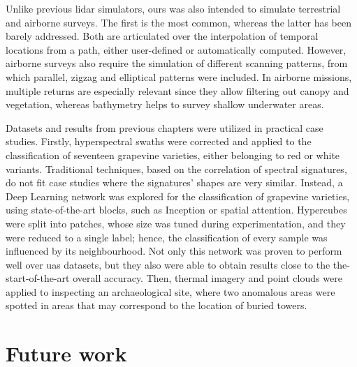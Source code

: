 Unlike previous \acrshort{lidar} simulators, ours was also intended to simulate terrestrial and airborne surveys. The first is the most common, whereas the latter has been barely addressed. Both are articulated over the interpolation of temporal locations from a path, either user-defined or automatically computed. However, airborne surveys also require the simulation of different scanning patterns, from which parallel, zigzag and elliptical patterns were included. In airborne missions, multiple returns are especially relevant since they allow filtering out canopy and vegetation, whereas bathymetry helps to survey shallow underwater areas. 

Datasets and results from previous chapters were utilized in practical case studies. Firstly, hyperspectral swaths were corrected and applied to the classification of seventeen grapevine varieties, either belonging to red or white variants. Traditional techniques, based on the correlation of spectral signatures, do not fit case studies where the signatures' shapes are very similar. Instead, a Deep Learning network was explored for the classification of grapevine varieties, using state-of-the-art blocks, such as Inception or spatial attention. Hypercubes were split into patches, whose size was tuned during experimentation, and they were reduced to a single label; hence, the classification of every sample was influenced by its neighbourhood. Not only this network was proven to perform well over \acrshort{uas} datasets, but they also were able to obtain results close to the the-start-of-the-art overall accuracy. Then, thermal imagery and point clouds were applied to inspecting an archaeological site, where two anomalous areas were spotted in areas that may correspond to the location of buried towers. 

\section{Future work}

